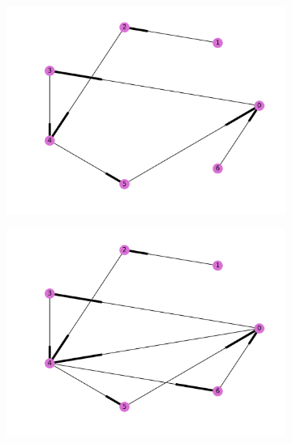 \documentclass[]{article}  %
\begin{document}
\begin{figure}
\centering
\begin{subfigure}{0.33\textwidth}
  \includegraphics[width=\textwidth]{figures/reduced_graph1.png}
\end{subfigure}%
\begin{subfigure}{0.33\textwidth}
  \includegraphics[width=\linewidth]{figures/reduced_graph3.png}
\end{subfigure}%
\begin{subfigure}{0.33\textwidth}

\end{subfigure}
\end{figure}
\end{document}
